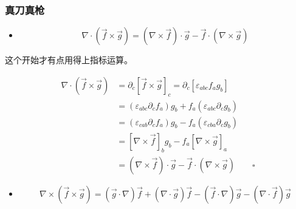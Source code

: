 \documentclass{article}
\begin{document}
\subsubsection{真刀真枪}

\begin{itemize}
    \item $$\nabla\cdot(\vec{f}\times\vec{g})=(\nabla\times\vec{f})\cdot\vec{g}-\vec{f}\cdot(\nabla\times\vec{g})$$
\end{itemize}

这个开始才有点用得上指标运算。

$$\begin{aligned}
        \nabla\cdot(\vec{f}\times\vec{g}) & =\partial_{c}[\vec{f}\times\vec{g}]_{c}=\partial_{c}[\varepsilon_{abc}f_{a}g_{b}]    \\
                                          & =(\varepsilon_{abc}\partial_{c}f_{a})g_{b}+f_{a}(\varepsilon_{abc}\partial_{c}g_{b}) \\
                                          & =(\varepsilon_{cab}\partial_{c}f_{a})g_{b}-f_{a}(\varepsilon_{cba}\partial_{c}g_{b}) \\
                                          & =[\nabla\times\vec{f}]_{b}g_{b}-f_{a}[\nabla\times\vec{g}]_{a}                       \\
                                          & =(\nabla\times\vec{f})\cdot\vec{g}-\vec{f}\cdot(\nabla\times\vec{g})\qquad\square
    \end{aligned}$$

\begin{itemize}
    \item $$\nabla\times(\vec{f}\times\vec{g})=(\vec{g}\cdot\nabla)\vec{f}+(\nabla\cdot\vec{g})\vec{f}-(\vec{f}\cdot\nabla)\vec{g}-(\nabla\cdot\vec{f})\vec{g}$$
\end{itemize}
\end{document}
